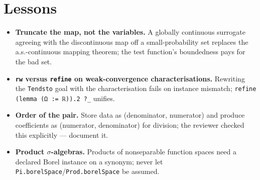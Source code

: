 \documentclass[11pt]{article}
\begin{document}
\section{Lessons}
\begin{itemize}
\item \textbf{Truncate the map, not the variables.} A globally continuous surrogate agreeing with the
discontinuous map off a small-probability set replaces the a.s.-continuous mapping theorem; the test
function's boundedness pays for the bad set.
\item \textbf{\texttt{rw} versus \texttt{refine} on weak-convergence characterisations.} Rewriting the
\texttt{Tendsto} goal with the characterisation fails on instance mismatch; \texttt{refine (lemma (Ω := ℝ)).2 ?\_}
unifies.
\item \textbf{Order of the pair.} Store data as (denominator, numerator) and produce coefficients as
(numerator, denominator) for division; the reviewer checked this explicitly --- document it.
\item \textbf{Product $\sigma$-algebras.} Products of nonseparable function spaces need a declared Borel
instance on a synonym; never let \texttt{Pi.borelSpace}/\texttt{Prod.borelSpace} be assumed.
\end{itemize}
\end{document}
